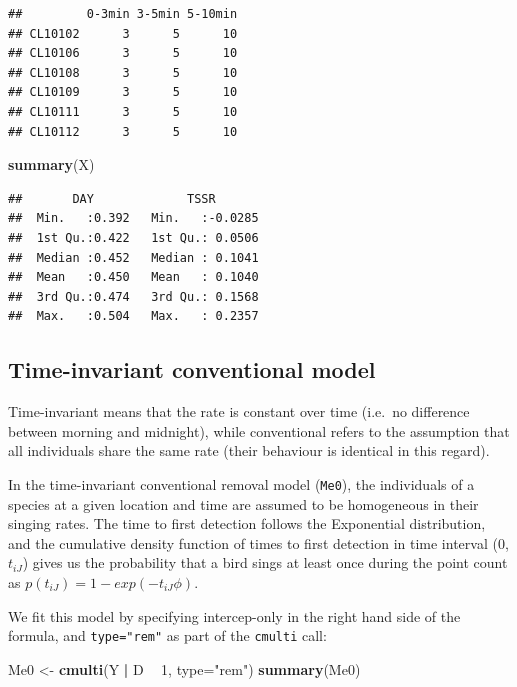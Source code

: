 \documentclass[12pt,]{book}
\newenvironment{Shaded}{\begin{snugshade}}{\end{snugshade}}
\newcommand{\DataTypeTok}[1]{\textcolor[rgb]{0.13,0.29,0.53}{#1}}
\newcommand{\DecValTok}[1]{\textcolor[rgb]{0.00,0.00,0.81}{#1}}
\newcommand{\KeywordTok}[1]{\textcolor[rgb]{0.13,0.29,0.53}{\textbf{#1}}}
\newcommand{\NormalTok}[1]{#1}
\newcommand{\OperatorTok}[1]{\textcolor[rgb]{0.81,0.36,0.00}{\textbf{#1}}}
\newcommand{\StringTok}[1]{\textcolor[rgb]{0.31,0.60,0.02}{#1}}
\begin{document}
\begin{verbatim}
##         0-3min 3-5min 5-10min
## CL10102      3      5      10
## CL10106      3      5      10
## CL10108      3      5      10
## CL10109      3      5      10
## CL10111      3      5      10
## CL10112      3      5      10
\end{verbatim}

\begin{Shaded}
\begin{Highlighting}[]
\KeywordTok{summary}\NormalTok{(X)}
\end{Highlighting}
\end{Shaded}

\begin{verbatim}
##       DAY             TSSR        
##  Min.   :0.392   Min.   :-0.0285  
##  1st Qu.:0.422   1st Qu.: 0.0506  
##  Median :0.452   Median : 0.1041  
##  Mean   :0.450   Mean   : 0.1040  
##  3rd Qu.:0.474   3rd Qu.: 0.1568  
##  Max.   :0.504   Max.   : 0.2357
\end{verbatim}

\hypertarget{time-invariant-conventional-model}{%
\subsection{Time-invariant conventional model}\label{time-invariant-conventional-model}}

Time-invariant means that the rate is constant over time
(i.e.~no difference between morning and midnight),
while conventional refers to the assumption
that all individuals share the same rate
(their behaviour is identical in this regard).

In the time-invariant conventional removal model (\texttt{Me0}),
the individuals of a species at a given location and time are assumed to be homogeneous
in their singing rates.
The time to first detection follows the Exponential distribution,
and the cumulative density function of times to first detection in time interval
(0, \(t_{iJ}\)) gives us the probability that a bird sings at least once during the point count as
\(p(t_{iJ}) = 1 - exp(-t_{iJ} \phi)\).

We fit this model by specifying intercep-only in the
right hand side of the formula, and \texttt{type="rem"}
as part of the \texttt{cmulti} call:

\begin{Shaded}
\begin{Highlighting}[]
\NormalTok{Me0 <-}\StringTok{ }\KeywordTok{cmulti}\NormalTok{(Y }\OperatorTok{|}\StringTok{ }\NormalTok{D }\OperatorTok{~}\StringTok{ }\DecValTok{1}\NormalTok{, }\DataTypeTok{type=}\StringTok{"rem"}\NormalTok{)}
\KeywordTok{summary}\NormalTok{(Me0)}
\end{Highlighting}
\end{Shaded}
\end{document}
